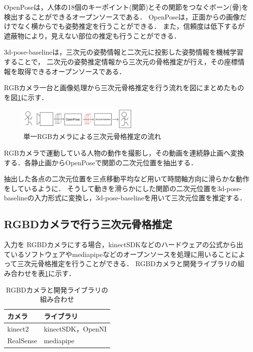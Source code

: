 \documentclass[titlepage]{jarticle}
\begin{document}
OpenPoseは，人体の18個のキーポイント(関節)とその関節をつなぐボーン(骨)を検出することができるオープンソースである．
OpenPoseは，正面からの画像だけでなく横からでも姿勢推定を行うことができる．
また，信頼度は低下するが遮蔽物により，見えない部位の推定も行うことができる．

3d-pose-baselineは，三次元の姿勢情報と二次元に投影した姿勢情報を機械学習することで，
二次元の姿勢推定情報から三次元の骨格推定が行え，その座標情報を取得できるオープンソースである．

RGBカメラ一台と画像処理から三次元骨格推定を行う\cite{ビデオ}流れを図にまとめたものを図\ref{RGB}に示す．

\begin{figure}[b!]
  \centering
  \includegraphics[width=6cm]{img/RGBcamera.jpg}
  \caption{単一RGBカメラによる三次元骨格推定の流れ}
  \label{RGB}
\end{figure}

RGBカメラで運動している人物の動作を撮影し，その動画を連続静止画へ変換する．各静止画からOpenPoseで関節の二次元位置を抽出する．

抽出した各点の二次元位置を三点移動平均など用いて時間軸方向に滑らかな動作をしているように．
そうして動きを滑らかにした関節の二次元位置を3d-pose-baselineの入力形式に変換し，3d-pose-baselineを用いて三次元位置を推定する．

\subsection{RGBDカメラで行う三次元骨格推定}
入力を
RGBDカメラにする場合，kinectSDK\cite{kinectSDK}などのハードウェアの公式から出ているソフトウェアやmediapipe\cite{cubemos}などのオープンソースを処理に用いることによって三次元骨格推定を行うことができる．
RGBDカメラと開発ライブラリの組み合わせを表\ref{RGBD}に示す．
\begin{table}[t!]
  \centering
  \caption{RGBDカメラと開発ライブラリの組み合わせ}
  \begin{tabular}{l|l}\hline
    カメラ       & ライブラリ            \\\hline
    kinect2   & kinectSDK，OpenNI \\
    RealSense & mediapipe        \\\hline
  \end{tabular}
  \label{RGBD}
\end{table}
\end{document}
